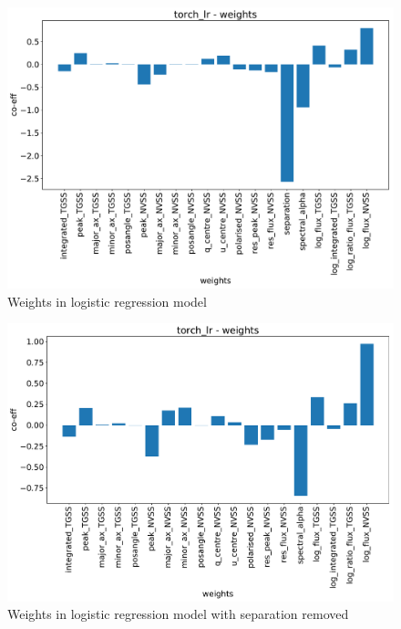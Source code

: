 \documentclass[12pt,a4paper]{article}
\begin{document}
\begin{figure}[H]
    \centering
    \includegraphics[width=\textwidth]{pics/torch_lr_weights.pdf}
    \caption{Weights in logistic regression model}
    \label{fig:torch_lr_weights}
\end{figure}

\begin{figure}[H]
    \centering
    \includegraphics[width=\textwidth]{pics/torch_lr_weights_nosep.pdf}
    \caption{Weights in logistic regression model with separation removed}
    \label{fig:torch_lr_weights_nosep}
\end{figure}
\end{document}
